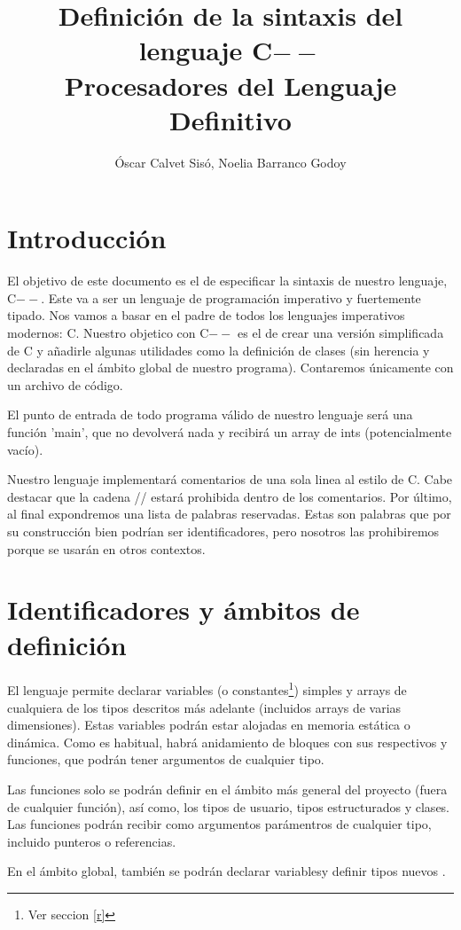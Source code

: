 \documentclass{article}
\title{%
  Definición de la sintaxis del lenguaje C$--$ \\
  \large Procesadores del Lenguaje Definitivo}
\author{Óscar Calvet Sisó, Noelia Barranco Godoy}
\date{}
\begin{document}
\maketitle

\section{Introducción}
El objetivo de este documento es el de especificar la sintaxis de nuestro lenguaje, C$--$. Este va a ser un lenguaje de programación imperativo y fuertemente tipado. Nos vamos a basar en el padre de todos los lenguajes imperativos modernos: C. Nuestro objetico con C$--$ es el de crear una versión simplificada de C y añadirle algunas utilidades como la definición de clases (sin herencia y declaradas en el ámbito global de nuestro programa). Contaremos únicamente con un archivo de código.

\noindent El punto de entrada de todo programa válido de nuestro lenguaje será una función 'main', que no devolverá nada y recibirá un array de ints (potencialmente vacío).

\noindent Nuestro lenguaje implementará comentarios de una sola linea al estilo de C. Cabe destacar que la cadena // estará prohibida dentro de los comentarios. Por último, al final expondremos una lista de palabras reservadas. Estas son palabras que por su construcción bien podrían ser identificadores, pero nosotros las prohibiremos porque se usarán en otros contextos.

\section{Identificadores y ámbitos de definición}
El lenguaje permite declarar variables (o constantes\footnote[1]{Ver seccion \ref{r}}) simples y arrays de cualquiera de los tipos descritos más adelante (incluidos arrays de varias dimensiones). Estas variables podrán estar alojadas en memoria estática o dinámica\footnotemark[1]. Como es habitual, habrá anidamiento de bloques con sus respectivos y funciones, que podrán tener argumentos de cualquier tipo\footnotemark[1].

\noindent Las funciones solo se podrán definir en el ámbito más general del proyecto (fuera de cualquier función), así como, los tipos de usuario, tipos estructurados y clases. Las funciones podrán recibir como argumentos parámentros de cualquier tipo, incluido punteros o referencias.

\noindent En el ámbito global, también se podrán declarar variables\footnotemark[1]y definir tipos nuevos .
\end{document}
